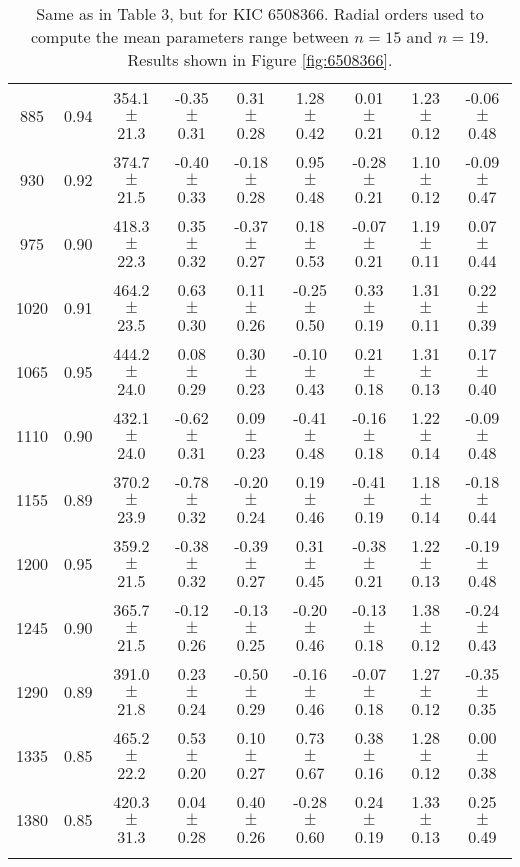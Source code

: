\documentclass[twocolumn]{aastex61}%
\begin{document}
\begin{table*}[ht]
\begin{tabular}{ccc|ccccc|c}
885 & 0.94 & 354.1 $\pm$ 21.3 & -0.35 $\pm$ 0.31 & 0.31 $\pm$ 0.28 & 1.28 $\pm$ 0.42 & 0.01 $\pm$ 0.21 & 1.23 $\pm$ 0.12 & -0.06 $\pm$ 0.48\\
930 & 0.92 & 374.7 $\pm$ 21.5 & -0.40 $\pm$ 0.33 & -0.18 $\pm$ 0.28 & 0.95 $\pm$ 0.48 & -0.28 $\pm$ 0.21 & 1.10 $\pm$ 0.12 & -0.09 $\pm$ 0.47\\
975 & 0.90 & 418.3 $\pm$ 22.3 & 0.35 $\pm$ 0.32 & -0.37 $\pm$ 0.27 & 0.18 $\pm$ 0.53 & -0.07 $\pm$ 0.21 & 1.19 $\pm$ 0.11 & 0.07 $\pm$ 0.44\\
1020 & 0.91 & 464.2 $\pm$ 23.5 & 0.63 $\pm$ 0.30 & 0.11 $\pm$ 0.26 & -0.25 $\pm$ 0.50 & 0.33 $\pm$ 0.19 & 1.31 $\pm$ 0.11 & 0.22 $\pm$ 0.39\\
1065 & 0.95 & 444.2 $\pm$ 24.0 & 0.08 $\pm$ 0.29 & 0.30 $\pm$ 0.23 & -0.10 $\pm$ 0.43 & 0.21 $\pm$ 0.18 & 1.31 $\pm$ 0.13 & 0.17 $\pm$ 0.40\\
1110 & 0.90 & 432.1 $\pm$ 24.0 & -0.62 $\pm$ 0.31 & 0.09 $\pm$ 0.23 & -0.41 $\pm$ 0.48 & -0.16 $\pm$ 0.18 & 1.22 $\pm$ 0.14 & -0.09 $\pm$ 0.48\\
1155 & 0.89 & 370.2 $\pm$ 23.9 & -0.78 $\pm$ 0.32 & -0.20 $\pm$ 0.24 & 0.19 $\pm$ 0.46 & -0.41 $\pm$ 0.19 & 1.18 $\pm$ 0.14 & -0.18 $\pm$ 0.44\\
1200 & 0.95 & 359.2 $\pm$ 21.5 & -0.38 $\pm$ 0.32 & -0.39 $\pm$ 0.27 & 0.31 $\pm$ 0.45 & -0.38 $\pm$ 0.21 & 1.22 $\pm$ 0.13 & -0.19 $\pm$ 0.48\\
1245 & 0.90 & 365.7 $\pm$ 21.5 & -0.12 $\pm$ 0.26 & -0.13 $\pm$ 0.25 & -0.20 $\pm$ 0.46 & -0.13 $\pm$ 0.18 & 1.38 $\pm$ 0.12 & -0.24 $\pm$ 0.43\\
1290 & 0.89 & 391.0 $\pm$ 21.8 & 0.23 $\pm$ 0.24 & -0.50 $\pm$ 0.29 & -0.16 $\pm$ 0.46 & -0.07 $\pm$ 0.18 & 1.27 $\pm$ 0.12 & -0.35 $\pm$ 0.35\\
1335 & 0.85 & 465.2 $\pm$ 22.2 & 0.53 $\pm$ 0.20 & 0.10 $\pm$ 0.27 & 0.73 $\pm$ 0.67 & 0.38 $\pm$ 0.16 & 1.28 $\pm$ 0.12 & 0.00 $\pm$ 0.38\\
1380 & 0.85 & 420.3 $\pm$ 31.3 & 0.04 $\pm$ 0.28 & 0.40 $\pm$ 0.26 & -0.28 $\pm$ 0.60 & 0.24 $\pm$ 0.19 & 1.33 $\pm$ 0.13 & 0.25 $\pm$ 0.49\\\vspace{-0.3cm}
\end{tabular}
\caption{Same as in Table 3, but for KIC 6508366. Radial orders used to compute the mean parameters range between $n=15$ and $n=19$. Results shown in Figure \ref{fig:6508366}.}\label{tab:6508366}\vspace{-0.1cm}
\end{table*}
\end{document}
